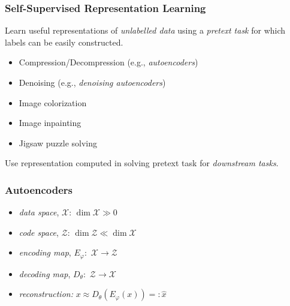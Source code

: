 \documentclass[xcolor={dvipsnames}]{beamer}
\renewcommand{\phi}{\varphi}
\newcommand{\df}[1]{\textcolor{BrickRed}{\emph{#1}}}
\newcommand{\cX}{\mathcal{X}}
\newcommand{\cZ}{\mathcal{Z}}
\begin{document}
\begin{frame}
    \frametitle{Self-Supervised Representation Learning}
    \setlength\parskip{1em}

    Learn useful representations of \df{unlabelled data} using a \df{pretext task} for which labels can be easily constructed.

    \begin{itemize}
        \setlength\itemsep{1em}
        \item Compression/Decompression (e.g., \df{autoencoders})
        \item Denoising (e.g., \df{denoising autoencoders})
        \item Image colorization
        \item Image inpainting
        \item Jigsaw puzzle solving
    \end{itemize}

    Use representation computed in solving pretext task for \df{downstream tasks}.
\end{frame}

\begin{frame}
    \frametitle{Autoencoders}
    \begin{itemize}
        \setlength\itemsep{1em}
    
        \item \df{data space}, $\cX$:  $\dim \cX\gg 0$
        
        \item \df{code space}, $\cZ$: $\dim \cZ \ll \dim \cX$
        
        \item \df{encoding map}, $E_\phi:$  $\cX\to\cZ$
        
        \item \df{decoding map}, $D_\theta:$  $\cZ\to\cX$
        
        \item \df{reconstruction:} $x \approx D_\theta(E_\phi(x)) =: \widehat{x}$
    \end{itemize}
    \end{frame}
\end{document}

